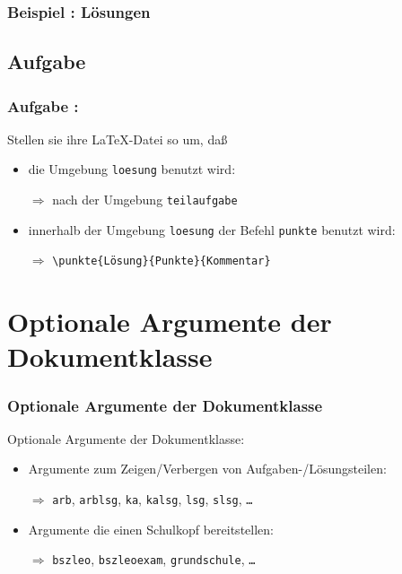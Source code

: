 \documentclass{beamer}
\newcounter{aufgabe}
\newcounter{beispiel}
\begin{document}
\begin{frame}[fragile]
  \frametitle{Beispiel \thebeispiel : Lösungen}


\end{frame}





\subsection{Aufgabe \theaufgabe}

\begin{frame}
  \frametitle{Aufgabe \theaufgabe:}

 Stellen sie ihre  \LaTeX -Datei so um, daß

  \begin{itemize}
  \item<1-> die Umgebung \texttt{loesung} benutzt wird:

   $\Longrightarrow$ nach der Umgebung \texttt{teilaufgabe}
  \item<1-> innerhalb der Umgebung \texttt{loesung} der Befehl \texttt{punkte} 
            benutzt wird:

   $\Longrightarrow$ \texttt{\textbackslash punkte\{Lösung\}\{Punkte\}\{Kommentar\}}
  \end{itemize}
\end{frame}



\section{Optionale Argumente der Dokumentklasse}

\begin{frame}
  \frametitle{Optionale Argumente der Dokumentklasse}

Optionale Argumente der Dokumentklasse:

  \begin{itemize}
  \item<1-> Argumente zum Zeigen/Verbergen von Aufgaben-/Lösungsteilen:

   $\Longrightarrow$ \texttt{arb}, \texttt{arblsg}, \texttt{ka}, \texttt{kalsg},
     \texttt{lsg}, \texttt{slsg}, \texttt{\dots}
  \item<1-> Argumente die einen Schulkopf bereitstellen:

   $\Longrightarrow$ \texttt{bszleo}, \texttt{bszleoexam}, 
     \texttt{grundschule}, \texttt{\ldots} 
   \end{itemize}
\end{frame}
\end{document}
